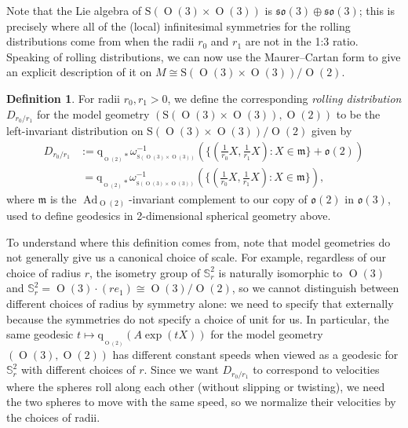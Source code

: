 \documentclass[12pt,a4paper]{amsart}
\theoremstyle{definition}
\newtheorem{definition}[theorem]{Definition}
\DeclareMathOperator{\Ad}{Ad}
\DeclareMathOperator{\Orth}{O}
\newcommand{\MC}[1]{\omega_{{}_{#1}}}
\newcommand{\quot}[1]{\mathrm{q}_{{}_{#1}}}
\begin{document}
Note that the Lie algebra of $\mathrm{S}(\Orth(3)\times\Orth(3))$ is $\mathfrak{so}(3)\oplus\mathfrak{so}(3)$; this is precisely where all of the (local) infinitesimal symmetries for the rolling distributions come from when the radii $r_0$ and $r_1$ are not in the 1:3 ratio. Speaking of rolling distributions, we can now use the Maurer--Cartan form to give an explicit description of it on $M\cong\mathrm{S}(\Orth(3)\times\Orth(3))/\Orth(2)$.

\begin{definition}\label{rollingdist} For radii $r_0,r_1>0$, we define the corresponding \emph{rolling distribution} $D_{r_0/r_1}$ for the model geometry $(\mathrm{S}(\Orth(3)\times\Orth(3)),\Orth(2))$ to be the left-invariant distribution on $\mathrm{S}(\Orth(3)\times\Orth(3))/\Orth(2)$ given by
\begin{align*}D_{r_0/r_1} & :=\mathrm{q}_{{}_{\Orth(2)}*}\MC{\mathrm{S}(\Orth(3)\times\Orth(3))}^{-1}(\{(\tfrac{1}{r_0}X,\tfrac{1}{r_1}X):X\in\mathfrak{m}\}+\mathfrak{o}(2)) \\ & ~=\mathrm{q}_{{}_{\Orth(2)}*}\MC{\mathrm{S}(\Orth(3)\times\Orth(3))}^{-1}(\{(\tfrac{1}{r_0}X,\tfrac{1}{r_1}X):X\in\mathfrak{m}\}),\end{align*}
where $\mathfrak{m}$ is the $\Ad_{\Orth(2)}$-invariant complement to our copy of $\mathfrak{o}(2)$ in $\mathfrak{o}(3)$, used to define geodesics in 2-dimensional spherical geometry above.\end{definition}

To understand where this definition comes from, note that model geometries do not generally give us a canonical choice of scale. For example, regardless of our choice of radius $r$, the isometry group of $\mathbb{S}^2_r$ is naturally isomorphic to $\Orth(3)$ and $\mathbb{S}^2_r=\Orth(3)\cdot(re_1)\cong\Orth(3)/\Orth(2)$, so we cannot distinguish between different choices of radius by symmetry alone: we need to specify that externally because the symmetries do not specify a choice of unit for us. In particular, the same geodesic $t\mapsto \quot{\Orth(2)}(A\exp(tX))$ for the model geometry $(\Orth(3),\Orth(2))$ has different constant speeds when viewed as a geodesic for $\mathbb{S}^2_{r}$ with different choices of $r$. Since we want $D_{r_0/r_1}$ to correspond to velocities where the spheres roll along each other (without slipping or twisting), we need the two spheres to move with the same speed, so we normalize their velocities by the choices of radii.
\end{document}
